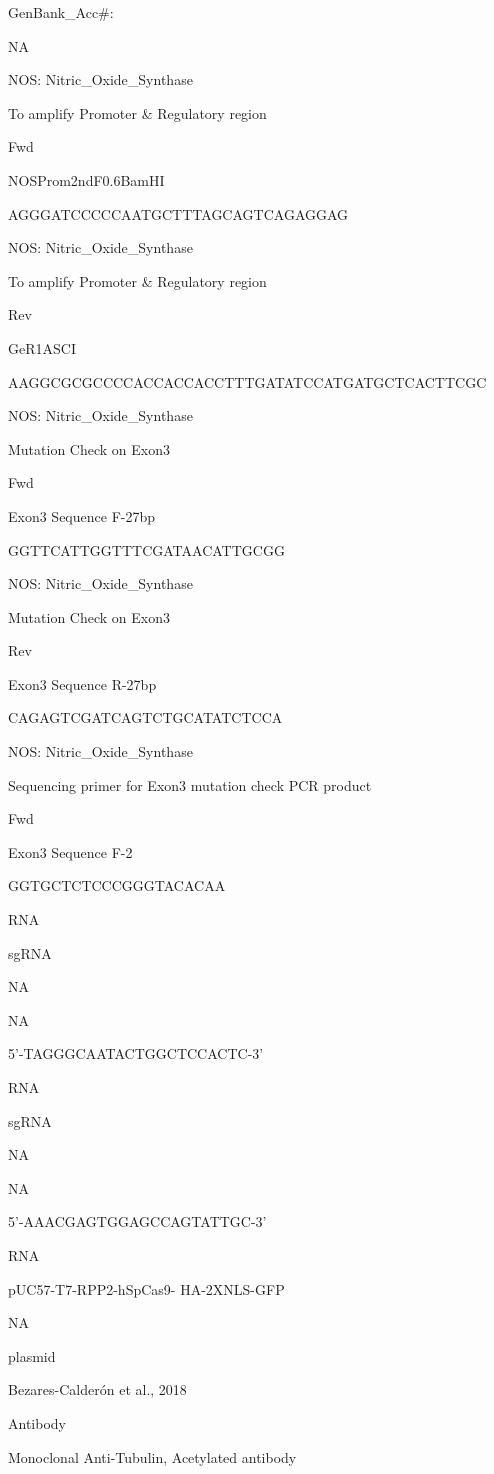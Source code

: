 \documentclass[
  10pt,
  onecolumn]{article}
\begin{document}
GenBank\_Acc\#:

NA

NOS: Nitric\_Oxide\_Synthase

To amplify Promoter \& Regulatory region

Fwd

NOSProm2ndF0.6BamHI

AGGGATCCCCCAATGCTTTAGCAGTCAGAGGAG

NOS: Nitric\_Oxide\_Synthase

To amplify Promoter \& Regulatory region

Rev

GeR1ASCI

AAGGCGCGCCCCACCACCACCTTTGATATCCATGATGCTCACTTCGC

NOS: Nitric\_Oxide\_Synthase

Mutation Check on Exon3

Fwd

Exon3 Sequence F-27bp

GGTTCATTGGTTTCGATAACATTGCGG

NOS: Nitric\_Oxide\_Synthase

Mutation Check on Exon3

Rev

Exon3 Sequence R-27bp

CAGAGTCGATCAGTCTGCATATCTCCA

NOS: Nitric\_Oxide\_Synthase

Sequencing primer for Exon3 mutation check PCR product

Fwd

Exon3 Sequence F-2

GGTGCTCTCCCGGGTACACAA

RNA

sgRNA

NA

NA

5'-TAGGGCAATACTGGCTCCACTC-3'

RNA

sgRNA

NA

NA

5'-AAACGAGTGGAGCCAGTATTGC-3'

RNA

pUC57-T7-RPP2-hSpCas9- HA-2XNLS-GFP

NA

plasmid

Bezares-Calderón et al., 2018

Antibody

Monoclonal Anti-Tubulin, Acetylated antibody
\end{document}
